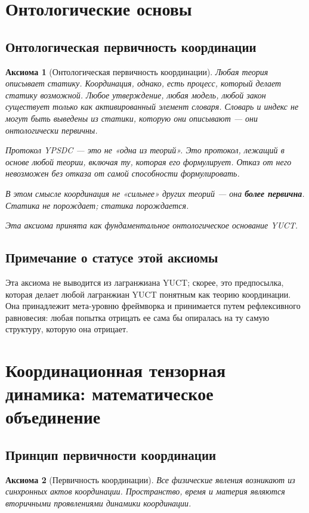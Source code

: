 \documentclass[11pt,a4paper]{article}
\newtheorem{axiom}{Аксиома}
\begin{document}
	
	\section{Онтологические основы}
	\label{sec:ontological-foundations}
	
	\subsection{Онтологическая первичность координации}
	\begin{axiom}[Онтологическая первичность координации]
		Любая теория описывает статику. Координация, однако, есть процесс, который делает статику возможной.
		Любое утверждение, любая модель, любой закон существует только как активированный элемент словаря.
		Словарь и индекс не могут быть выведены из статики, которую они описывают — они онтологически первичны.
		
		Протокол YPSDC — это не «одна из теорий».
		Это протокол, лежащий в основе любой теории, включая ту, которая его формулирует.
		Отказ от него невозможен без отказа от самой способности формулировать.
		
		В этом смысле координация не «сильнее» других теорий — она \textbf{более первична}.
		Статика не порождает; статика порождается.
		
		Эта аксиома принята как фундаментальное онтологическое основание YUCT.
	\end{axiom}
	\subsection*{Примечание о статусе этой аксиомы}
	Эта аксиома не выводится из лагранжиана YUCT; скорее, это предпосылка, которая делает любой лагранжиан YUCT понятным как теорию координации. Она принадлежит мета-уровню фреймворка и принимается путем рефлексивного равновесия: любая попытка отрицать ее сама бы опиралась на ту самую структуру, которую она отрицает.
	
	\section{Координационная тензорная динамика: математическое объединение}
	\label{sec:ctd-unification}
	
	\subsection{Принцип первичности координации}
	\begin{axiom}[Первичность координации]
		Все физические явления возникают из синхронных актов координации. 
		Пространство, время и материя являются вторичными проявлениями динамики координации.
	\end{axiom}
	
\end{document}
